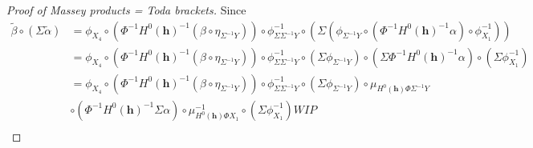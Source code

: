 \begin{proof}[Proof of Massey products = Toda brackets]
    Since
    \begin{align*}
        \tilde{\beta} \circ (\Sigma \tilde{\alpha}) &= \phi_{X_4} \circ (\Phi^{-1} H^0(\mathbf{h})^{-1} (\beta \circ \eta_{\Sigma^{-1} Y})) \circ \phi^{-1}_{\Sigma \Sigma^{-1} Y} \circ
        (\Sigma (\phi_{\Sigma^{-1} Y} \circ (\Phi^{-1} H^0(\mathbf{h})^{-1} \alpha) \circ \phi^{-1}_{X_1})) \\
        &= \phi_{X_4} \circ (\Phi^{-1} H^0(\mathbf{h})^{-1} (\beta \circ \eta_{\Sigma^{-1} Y})) \circ \phi^{-1}_{\Sigma \Sigma^{-1} Y} \circ
        (\Sigma \phi_{\Sigma^{-1} Y}) \circ (\Sigma \Phi^{-1} H^0(\mathbf{h})^{-1} \alpha) \circ (\Sigma \phi^{-1}_{X_1}) \\
        &= \phi_{X_4} \circ (\Phi^{-1} H^0(\mathbf{h})^{-1} (\beta \circ \eta_{\Sigma^{-1} Y})) \circ \phi^{-1}_{\Sigma \Sigma^{-1} Y} \circ
        (\Sigma \phi_{\Sigma^{-1} Y}) \circ \mu_{H^0(\mathbf{h}) \Phi \Sigma^{-1} Y} \\
        &\circ (\Phi^{-1} H^0(\mathbf{h})^{-1} \Sigma \alpha) \circ \mu^{-1}_{H^0(\mathbf{h}) \Phi X_1} \circ (\Sigma \phi^{-1}_{X_1}) WIP \\
    \end{align*}
\end{proof}
